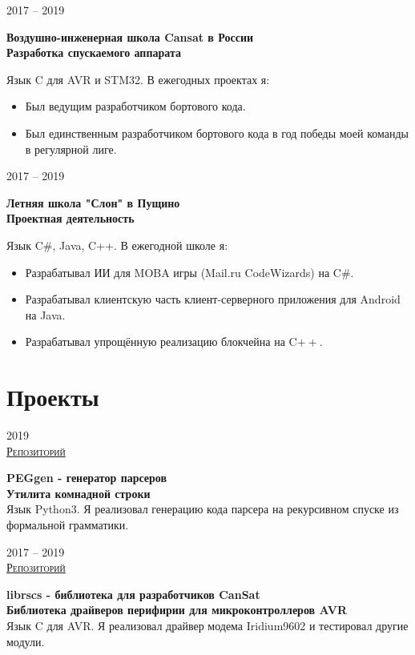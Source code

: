 \documentclass{article}
\newcommand{\entry}[3]{
    \begin{minipage}[t]{.11\linewidth}
        \hfill \textsc{#1}
    \end{minipage}
    \hfill\vline\hfill
    \begin{minipage}[t]{.80\linewidth}
        \textbf{#2} \\
        \footnotesize{#3}
    \end{minipage}
}
\begin{document}
        \vspace{.2cm}  
    
        \entry {2017 -- 2019 \\
        }
        {Воздушно-инженерная школа Cansat в России\\
        Разработка спускаемого аппарата}
        {Язык C для AVR и STM32. В ежегодных проектах я:
        \begin{itemize}
            \item Был ведущим разработчиком бортового кода.
            \item Был единственным разработчиком бортового кода в год победы моей команды в регулярной лиге.
        \end{itemize} 
        } 
        
        \vspace{.2cm}
        
        \entry {2017 -- 2019 \\
        }
        {Летняя школа "Слон" в Пущино\\
        Проектная деятельность}
        {Язык C$\boldsymbol{\#}$, Java, C++. В ежегодной школе я:
        \begin{itemize}
            \item Разрабатывал ИИ для MOBA игры (Mail.ru CodeWizards) на C$\boldsymbol{\#}$. 
            \item Разрабатывал клиентскую часть клиент-серверного приложения для Android на Java.
            \item Разрабатывал упрощённую реализацию блокчейна на C$\boldsymbol{++}$.
        \end{itemize} 
        }
        
    \section{Проекты}
        
    \entry {2019 \\
    \href {https://github.com/InversionSpaces/PEGgen} {Репозиторий} }
    {PEGgen - генератор парсеров \\
    Утилита комнадной строки}
    {Язык Python3. Я реализовал генерацию кода парсера на рекурсивном спуске из формальной грамматики.} 
    
    \vspace{.2cm}
    
    \entry {2017 -- 2019 \\
    \href {https://github.com/cansat-rsce/librscs} {Репозиторий} }
    {librscs - библиотека для разработчиков CanSat \\
    Библиотека драйверов перифирии для микроконтроллеров AVR}
    {Язык C для AVR. Я реализовал драйвер модема Iridium9602 и тестировал другие модули.} 
\end{document}
